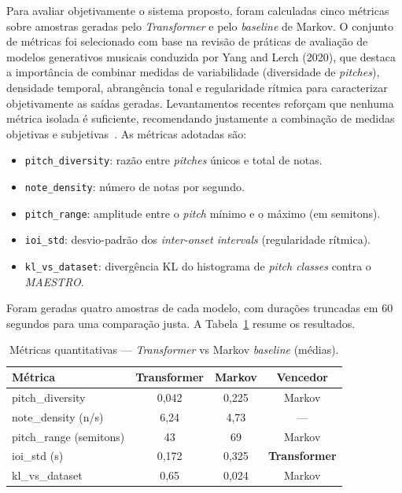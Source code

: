 \documentclass[12pt]{article}
\begin{document}
Para avaliar objetivamente o sistema proposto, foram calculadas cinco métricas
sobre amostras geradas pelo \emph{Transformer} e pelo \emph{baseline} de Markov. O
conjunto de métricas foi selecionado com base na revisão de práticas de avaliação
de modelos generativos musicais conduzida por Yang and Lerch (2020), que destaca a
importância de combinar medidas de variabilidade (diversidade de \emph{pitches}),
densidade temporal, abrangência tonal e regularidade rítmica para caracterizar
objetivamente as saídas geradas. Levantamentos recentes reforçam que nenhuma
métrica isolada é suficiente, recomendando justamente a combinação de medidas
objetivas e subjetivas~\cite{kader2025}. As métricas adotadas são:

\begin{itemize}
  \item \texttt{pitch\_diversity}: razão entre \emph{pitches} únicos e total de
    notas.
  \item \texttt{note\_density}: número de notas por segundo.
  \item \texttt{pitch\_range}: amplitude entre o \emph{pitch} mínimo e o máximo
    (em semitons).
  \item \texttt{ioi\_std}: desvio-padrão dos \emph{inter-onset intervals}
    (regularidade rítmica).
  \item \texttt{kl\_vs\_dataset}: divergência KL do histograma de \emph{pitch
    classes} contra o \emph{MAESTRO}.
\end{itemize}

Foram geradas quatro amostras de cada modelo, com durações truncadas em 60
segundos para uma comparação justa. A Tabela~\ref{tab:metricas} resume os
resultados.

\begin{table}[ht]
\centering
\caption{Métricas quantitativas --- \emph{Transformer} vs Markov \emph{baseline}
(médias).}
\label{tab:metricas}
\begin{tabular}{|l|c|c|c|}
\hline
\textbf{Métrica} & \textbf{Transformer} & \textbf{Markov} & \textbf{Vencedor} \\
\hline
pitch\_diversity & 0,042 & 0,225 & Markov \\
note\_density (n/s) & 6,24 & 4,73 & --- \\
pitch\_range (semitons) & 43 & 69 & Markov \\
ioi\_std (s) & 0,172 & 0,325 & \textbf{Transformer} \\
kl\_vs\_dataset & 0,65 & 0,024 & Markov \\
\hline
\end{tabular}
\end{table}
\end{document}
